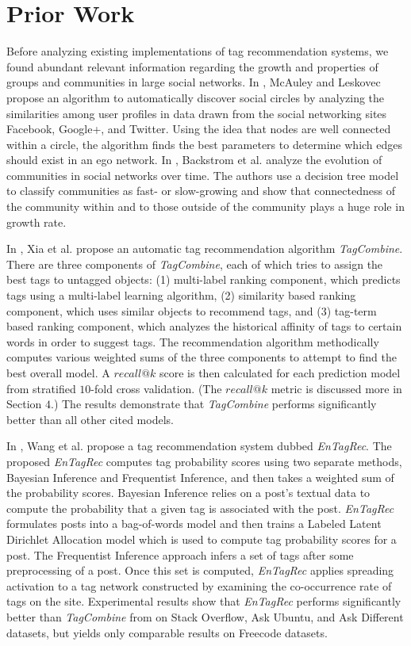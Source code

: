 \documentclass[10pt]{IEEEtran}
\begin{document}
\section{Prior Work}

Before analyzing existing implementations of tag recommendation systems, we found abundant relevant information regarding the growth and properties of groups and communities in large social networks. In \cite{2}, McAuley and Leskovec propose an algorithm to automatically discover social circles by analyzing the similarities among user profiles in data drawn from the social networking sites Facebook, Google+, and Twitter. Using the idea that nodes are well connected within a circle, the algorithm finds the best parameters to determine which edges should exist in an ego network. In \cite{3}, Backstrom et al. analyze the evolution of communities in social networks over time. The authors use a decision tree model to classify communities as fast- or slow-growing and show that connectedness of the community within and to those outside of the community plays a huge role in growth rate.

In \cite{1}, Xia et al. propose an automatic tag recommendation algorithm \textit{TagCombine}. There are three components of \textit{TagCombine}, each of which tries to assign the best tags to untagged objects: (1) multi-label ranking component, which predicts tags using a multi-label learning algorithm, (2) similarity based ranking component, which uses similar objects to recommend tags, and (3) tag-term based ranking component, which analyzes the historical affinity of tags to certain words in order to suggest tags. The recommendation algorithm methodically computes various weighted sums of the three components to attempt to find the best overall model. A $recall@k$ score is then calculated for each prediction model from stratified $10$-fold cross validation. (The $recall@k$ metric is discussed more in Section $4$.) The results demonstrate that \textit{TagCombine} performs significantly better than all other cited models.

In \cite{5}, Wang et al. propose a tag recommendation system dubbed \textit{EnTagRec}. The proposed \textit{EnTagRec} computes tag probability scores using two separate methods, Bayesian Inference and Frequentist Inference, and then takes a weighted sum of the probability scores. Bayesian Inference relies on a post’s textual data to compute the probability that a given tag is associated with the post. \textit{EnTagRec} formulates posts into a bag-of-words model and then trains a Labeled Latent Dirichlet Allocation model which is used to compute tag probability scores for a post. The Frequentist Inference approach infers a set of tags after some preprocessing of a post. Once this set is computed, \textit{EnTagRec} applies spreading activation to a tag network constructed by examining the co-occurrence rate of tags on the site. Experimental results show that \textit{EnTagRec} performs significantly better than \textit{TagCombine} from \cite{1} on Stack Overflow, Ask Ubuntu, and Ask Different datasets, but yields only comparable results on Freecode datasets.
\end{document}
